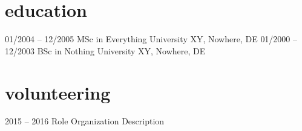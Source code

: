 \documentclass[]{friggeri-minimal-cv}
\begin{document}
\section{education}

\begin{entrylist}
  \monthentry
    {01/2004 -- 12/2005}
    {MSc in Everything}
    {University XY, Nowhere, DE}
    {}
  \shortmonthentry
    {01/2000 -- 12/2003}
    {BSc in Nothing}
    {University XY, Nowhere, DE}
\end{entrylist}

\section{volunteering}

\begin{entrylist}
  \yearentry
    {2015 -- 2016}
    {Role}
    {Organization}
    {Description}
\end{entrylist}
\end{document}
